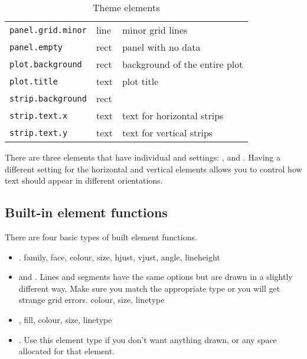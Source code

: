 \begin{table}
\begin{center}
\begin{tabular}{lll}
    \texttt{panel.grid.minor}  & line     & minor grid lines \\[0.5em]
    \texttt{panel.empty}       & rect     & panel with no data   \\
    \texttt{plot.background}   & rect     & background of the entire plot \\
    \texttt{plot.title}        & text     & plot title   \\[0.5em]
    \texttt{strip.background}  & rect     &   \\
    \texttt{strip.text.x}      & text     & text for horizontal strips  \\
    \texttt{strip.text.y}      & text     & text for vertical strips  \\
    \bottomrule                           
  
  \end{tabular}
  \end{center}
  \caption{Theme elements}
  \label{tbl:elements}
\end{table}

There are three elements that have individual  and  settings: ,  and .  Having a different setting for the horizontal and vertical elements allows you to control how text should appear in different orientations.

\subsection{Built-in element functions}

There are four basic types of built element functions.

\begin{itemize}
  \item {}. family, face, colour, size, hjust, vjust, angle, lineheight

  \item {} and .  Lines and segments have the same options but are drawn in a slightly different way.  Make sure you match the appropriate type or you will get strange grid errors.  colour, size, linetype

  \item {}, fill, colour, size, linetype

  \item {}.  Use this element type if you don't want anything drawn, or any space allocated for that element.  

\end{itemize}

